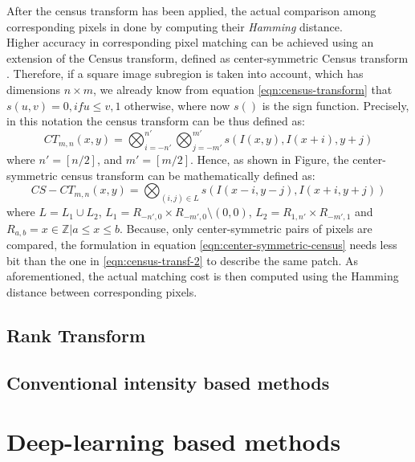 After the census transform has been applied, the actual comparison among corresponding pixels in done by computing their \textit{Hamming} distance.\\ 
Higher accuracy in corresponding pixel matching can be achieved using an extension of the Census transform, defined as center-symmetric Census transform \cite{Spangenberg2013}.
Therefore, if a square image subregion is taken into account, which has dimensions $n \times m$, we already know from equation \ref{eqn:census-transform} that $s(u, v) = 0, if u \leq v, 1$ otherwise, where now $s( )$ is the sign function.
Precisely, in this notation the census transform can be thus defined as:
\begin{equation}
	\label{eqn:census-transf-2}
	CT_{m,n}(x, y) = \bigotimes_{i = -n'}^{n'} \bigotimes_{j = -m'}^{m'} s(I(x, y), I(x + i), y + j)
\end{equation}
where $n' = [n/2]$, and $m' = [m/2]$.
Hence, as shown in Figure, the center-symmetric census transform can be mathematically defined as:
\begin{equation}
	\label{eqn:center-symmetric-census}
	CS-CT_{m,n}(x, y) = \bigotimes_{(i, j) \in L} s(I(x - i, y - j), I(x + i, y + j))
\end{equation}
where $L = L_1 \cup L_2$, $L_1 = R_{-n',0} \times R_{-m',0} \setminus {(0, 0)}$, $L_2 = R_{1,n'} \times R_{-m',1}$ and $R_{a, b} = {x \in \mathbb{Z} \vert a \leq x \leq b}$.
Because, only center-symmetric pairs of pixels are compared, the formulation in equation \ref{eqn:center-symmetric-census} needs less bit than the one in \ref{eqn:census-transf-2} to describe the same patch. 
As aforementioned, the actual matching cost is then computed using the Hamming distance between corresponding pixels. 

\subsection{Rank Transform}
\label{subsection:rank-transform}

\subsection{Conventional intensity based methods}
\label{subsection:conventional-methods}

\section{Deep-learning based methods}
\label{section:deep-learning-method}




